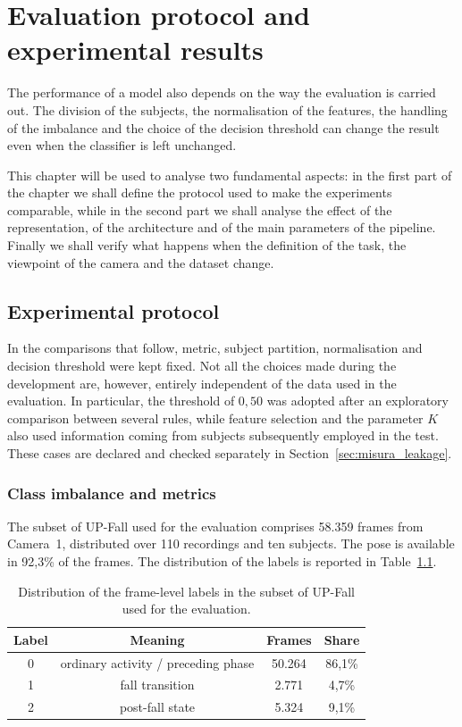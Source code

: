 \chapter{Evaluation protocol and experimental results}
\label{cap:sperimentale}

The performance of a model also depends on the way the evaluation is carried out. The division of the subjects, the normalisation of the features, the handling of the imbalance and the choice of the decision threshold can change the result even when the classifier is left unchanged.

This chapter will be used to analyse two fundamental aspects:
in the first part of the chapter we shall define the protocol used to make the experiments comparable, while in the second part we shall analyse the effect of the representation, of the architecture and of the main parameters of the pipeline. Finally we shall verify what happens when the definition of the task, the viewpoint of the camera and the dataset change.

\section{Experimental protocol}
\label{cap:protocollo}

In the comparisons that follow, metric, subject partition, normalisation and decision threshold were kept fixed. Not all the choices made during the development are, however, entirely independent of the data used in the evaluation. In particular, the threshold of $0{,}50$ was adopted after an exploratory comparison between several rules, while feature selection and the parameter $K$ also used information coming from subjects subsequently employed in the test. These cases are declared and checked separately in Section~\ref{sec:misura_leakage}.

\subsection{Class imbalance and metrics}
\label{sec:metriche}

The subset of UP-Fall used for the evaluation comprises 58.359 frames from Camera~1, distributed over 110 recordings and ten subjects. The pose is available in 92,3\% of the frames. The distribution of the labels is reported in Table~\ref{tab:etichette_valutazione}.

\begin{table}[ht]
\centering
\caption{Distribution of the frame-level labels in the subset
of UP-Fall used for the evaluation.}
\label{tab:etichette_valutazione}
\begin{tabular}{cccc}
\toprule
\textbf{Label} & \textbf{Meaning} &
\textbf{Frames} & \textbf{Share} \\
\midrule
0 & ordinary activity / preceding phase & 50.264 & 86,1\% \\
1 & fall transition & 2.771 & 4,7\% \\
2 & post-fall state & 5.324 & 9,1\% \\
\bottomrule
\end{tabular}
\end{table}

